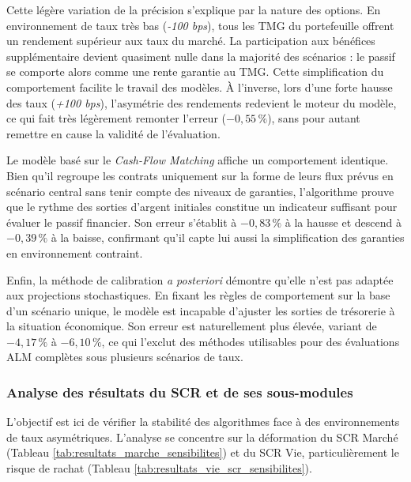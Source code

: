 Cette légère variation de la précision s'explique par la nature des options. En environnement de taux très bas (\textit{-100 bps}), tous les TMG du portefeuille offrent un rendement supérieur aux taux du marché. La participation aux bénéfices supplémentaire devient quasiment nulle dans la majorité des scénarios : le passif se comporte alors comme une rente garantie au TMG. Cette simplification du comportement facilite le travail des modèles. À l'inverse, lors d'une forte hausse des taux (\textit{+100 bps}), l'asymétrie des rendements redevient le moteur du modèle, ce qui fait très légèrement remonter l'erreur ($-0{,}55\,\%$), sans pour autant remettre en cause la validité de l'évaluation.

Le modèle basé sur le \textit{Cash-Flow Matching} affiche un comportement identique. Bien qu'il regroupe les contrats uniquement sur la forme de leurs flux prévus en scénario central sans tenir compte des niveaux de garanties, l'algorithme prouve que le rythme des sorties d'argent initiales constitue un indicateur suffisant pour évaluer le passif financier. Son erreur s'établit à $-0{,}83\,\%$ à la hausse et descend à $-0{,}39\,\%$ à la baisse, confirmant qu'il capte lui aussi la simplification des garanties en environnement contraint.

Enfin, la méthode de calibration \textit{a posteriori} démontre qu'elle n'est pas adaptée aux projections stochastiques. En fixant les règles de comportement sur la base d'un scénario unique, le modèle est incapable d'ajuster les sorties de trésorerie à la situation économique. Son erreur est naturellement plus élevée, variant de $-4{,}17\,\%$ à $-6{,}10\,\%$, ce qui l'exclut des méthodes utilisables pour des évaluations ALM complètes sous plusieurs scénarios de taux.

\subsubsection{Analyse des résultats du SCR et de ses sous-modules}

L'objectif est ici de vérifier la stabilité des algorithmes face à des environnements de taux asymétriques. L'analyse se concentre sur la déformation du SCR Marché (Tableau \ref{tab:resultats_marche_sensibilites}) et du SCR Vie, particulièrement le risque de rachat (Tableau \ref{tab:resultats_vie_scr_sensibilites}).

